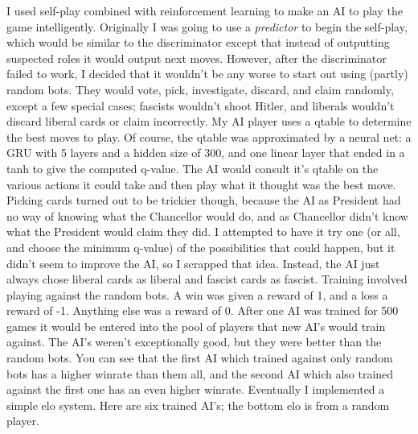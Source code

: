 \documentclass[]{article}
\begin{document}
I used self-play combined with reinforcement learning to make an AI to play the game intelligently. Originally I was going to use a \emph{predictor} to begin the self-play, which would be similar to the discriminator except that instead of outputting suspected roles it would output next moves. However, after the discriminator failed to work, I decided that it wouldn't be any worse to start out using (partly) random bots. They would vote, pick, investigate, discard, and claim randomly, except a few special cases; fascists wouldn't shoot Hitler, and liberals wouldn't discard liberal cards or claim incorrectly.
\newline\indent
My AI player uses a qtable to determine the best moves to play. Of course, the qtable was approximated by a neural net: a GRU with 5 layers and a hidden size of 300, and one linear layer that ended in a tanh to give the computed q-value. The AI would consult it's qtable on the various actions it could take and then play what it thought was the best move. Picking cards turned out to be trickier though, because the AI as President had no way of knowing what the Chancellor would do, and as Chancellor didn't know what the President would claim they did. I attempted to have it try one (or all, and choose the minimum q-value) of the possibilities that could happen, but it didn't seem to improve the AI, so I scrapped that idea. Instead, the AI just always chose liberal cards as liberal and fascist cards as fascist.
\newline\indent
Training involved playing against the random bots. A win was given a reward of 1, and a loss a reward of -1. Anything else was a reward of 0. After one AI was trained for 500 games it would be entered into the pool of players that new AI's would train against. The AI's weren't exceptionally good, but they were better than the random bots.
\newline\indent
You can see that the first AI which trained against only random bots has a higher winrate than them all, and the second AI which also trained against the first one has an even higher winrate. Eventually I implemented a simple elo system. Here are six trained AI's; the bottom elo is from a random player.
\newline
\end{document}
